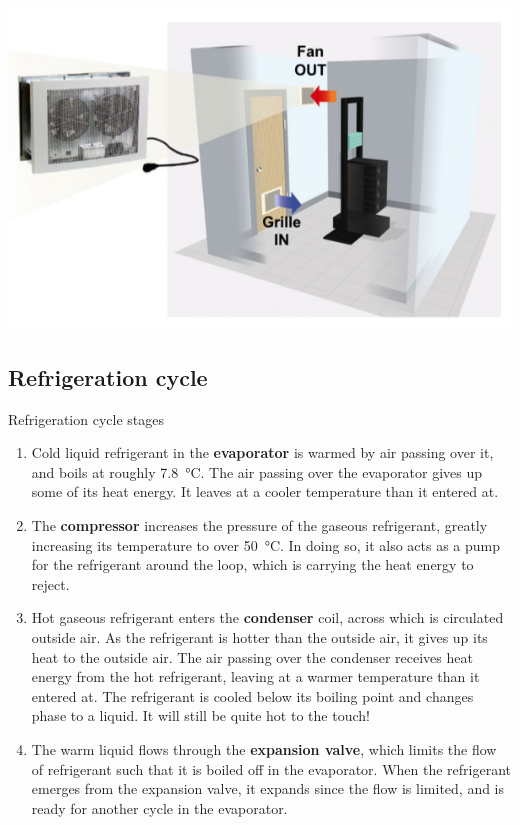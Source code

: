 \documentclass[slides]{pgnotes}
\begin{document}
\newpage

\begin{center}
  \includegraphics[height=0.7\paperheight]{fan_assisted_ventilation}
\end{center}



\subsection{Refrigeration cycle}

\begin{bluebox}{Refrigeration cycle stages}
  \begin{small}
\begin{enumerate}
\item Cold liquid refrigerant in the \textbf{evaporator} is warmed by air passing over it, and boils at roughly \SI{7.8}{\degreeCelsius}. The air passing over the evaporator gives up some of its heat energy. It leaves at a cooler temperature than it entered at.
\item The \textbf{compressor} increases the pressure of the gaseous refrigerant, greatly increasing its temperature to over \SI{50}{\degreeCelsius}.  In doing so, it also acts as a pump for the refrigerant around the loop, which is carrying the heat energy to reject.
\item Hot gaseous refrigerant enters the \textbf{condenser} coil, across which is circulated outside air. As the refrigerant is hotter than the outside air, it gives up its heat to the outside air.  The air passing over the condenser receives heat energy from the hot refrigerant, leaving at a warmer temperature than it entered at. The refrigerant is cooled below its boiling point and changes phase to a liquid.  It will still be quite hot to the touch!
\item The warm liquid flows through the \textbf{expansion valve}, which limits the flow of refrigerant such that it is boiled off in the evaporator. When the refrigerant emerges from the expansion valve, it expands since the flow is limited, and is ready for another cycle in the evaporator. 
\end{enumerate}
\end{small}
\end{bluebox}
\end{document}
